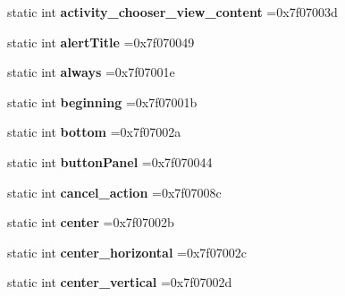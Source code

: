 \begin{DoxyCompactItemize}
static int {\bfseries activity\+\_\+chooser\+\_\+view\+\_\+content} =0x7f07003d
\item 
\mbox{\label{classandroid_1_1support_1_1v4_1_1R_1_1id_ab77abae10981f541dfe2a75d66b4454e}} 
static int {\bfseries alert\+Title} =0x7f070049
\item 
\mbox{\label{classandroid_1_1support_1_1v4_1_1R_1_1id_acb0e8753222f35884ed9ad0fa2432bc9}} 
static int {\bfseries always} =0x7f07001e
\item 
\mbox{\label{classandroid_1_1support_1_1v4_1_1R_1_1id_ad2c993a285b47c05a132be8e1a655d27}} 
static int {\bfseries beginning} =0x7f07001b
\item 
\mbox{\label{classandroid_1_1support_1_1v4_1_1R_1_1id_a304fa75a7c7f13269640494f58b1265d}} 
static int {\bfseries bottom} =0x7f07002a
\item 
\mbox{\label{classandroid_1_1support_1_1v4_1_1R_1_1id_adbc3c84e1d7f954d3c5925605d19d0c5}} 
static int {\bfseries button\+Panel} =0x7f070044
\item 
\mbox{\label{classandroid_1_1support_1_1v4_1_1R_1_1id_add0cb82384970900a818a3eafbb41ac7}} 
static int {\bfseries cancel\+\_\+action} =0x7f07008c
\item 
\mbox{\label{classandroid_1_1support_1_1v4_1_1R_1_1id_a16201fa2007de8bd81644fc929c9f69a}} 
static int {\bfseries center} =0x7f07002b
\item 
\mbox{\label{classandroid_1_1support_1_1v4_1_1R_1_1id_a4036e3172177fcbfe97bf35010214fbe}} 
static int {\bfseries center\+\_\+horizontal} =0x7f07002c
\item 
\mbox{\label{classandroid_1_1support_1_1v4_1_1R_1_1id_a6c99e86dcf2b565bd481db5c4f5efc2e}} 
static int {\bfseries center\+\_\+vertical} =0x7f07002d
\item 
\mbox{\label{classandroid_1_1support_1_1v4_1_1R_1_1id_abeecaa9ba717702d4002d5fbe1e34c8d}} 

\end{DoxyCompactItemize}
